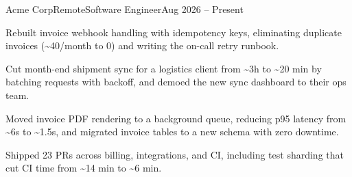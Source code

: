\begin{role}{Acme Corp}{Remote}{Software Engineer}{Aug 2026 -- Present}
\item Rebuilt invoice webhook handling with idempotency keys, eliminating duplicate invoices (\textasciitilde40/month to 0) and writing the on-call retry runbook.
\item Cut month-end shipment sync for a logistics client from \textasciitilde3h to \textasciitilde20 min by batching requests with backoff, and demoed the new sync dashboard to their ops team.
\item Moved invoice PDF rendering to a background queue, reducing p95 latency from \textasciitilde6s to \textasciitilde1.5s, and migrated invoice tables to a new schema with zero downtime.
\item Shipped 23 PRs across billing, integrations, and CI, including test sharding that cut CI time from \textasciitilde14 min to \textasciitilde6 min.
\end{role}
